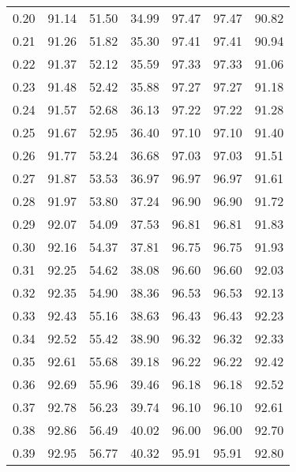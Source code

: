 \begin{tabular}{|c|c|c|c|c|c|c|}
      0.20 &     91.14 &     51.50 &      34.99 &   97.47 &      97.47 &         90.82 \\
      0.21 &     91.26 &     51.82 &      35.30 &   97.41 &      97.41 &         90.94 \\
      0.22 &     91.37 &     52.12 &      35.59 &   97.33 &      97.33 &         91.06 \\
      0.23 &     91.48 &     52.42 &      35.88 &   97.27 &      97.27 &         91.18 \\
      0.24 &     91.57 &     52.68 &      36.13 &   97.22 &      97.22 &         91.28 \\
      0.25 &     91.67 &     52.95 &      36.40 &   97.10 &      97.10 &         91.40 \\
      0.26 &     91.77 &     53.24 &      36.68 &   97.03 &      97.03 &         91.51 \\
      0.27 &     91.87 &     53.53 &      36.97 &   96.97 &      96.97 &         91.61 \\
      0.28 &     91.97 &     53.80 &      37.24 &   96.90 &      96.90 &         91.72 \\
      0.29 &     92.07 &     54.09 &      37.53 &   96.81 &      96.81 &         91.83 \\
      0.30 &     92.16 &     54.37 &      37.81 &   96.75 &      96.75 &         91.93 \\
      0.31 &     92.25 &     54.62 &      38.08 &   96.60 &      96.60 &         92.03 \\
      0.32 &     92.35 &     54.90 &      38.36 &   96.53 &      96.53 &         92.13 \\
      0.33 &     92.43 &     55.16 &      38.63 &   96.43 &      96.43 &         92.23 \\
      0.34 &     92.52 &     55.42 &      38.90 &   96.32 &      96.32 &         92.33 \\
      0.35 &     92.61 &     55.68 &      39.18 &   96.22 &      96.22 &         92.42 \\
      0.36 &     92.69 &     55.96 &      39.46 &   96.18 &      96.18 &         92.52 \\
      0.37 &     92.78 &     56.23 &      39.74 &   96.10 &      96.10 &         92.61 \\
      0.38 &     92.86 &     56.49 &      40.02 &   96.00 &      96.00 &         92.70 \\
      0.39 &     92.95 &     56.77 &      40.32 &   95.91 &      95.91 &         92.80 \\

\end{tabular}
